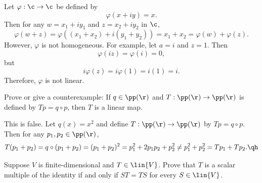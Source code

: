 \begin{sol}
    Let $\varphi: \c \to \c$ be defined by
    \[\varphi(x + iy) = x.\]
    Then for any $w = x_1 + iy_1$ and $z = x_2 + iy_2$ in $\c$,
    \[\varphi(w + z) = \varphi((x_1 + x_2) + i(y_1 + y_2)) = x_1 + x_2 = \varphi(w) + \varphi(z).\]
    However, $\varphi$ is not homogeneous. For example, let $a = i$ and $z = 1$. Then
    \[\varphi(iz) = \varphi(i) = 0,\]
    but
    \[i\varphi(z) = i\varphi(1) = i(1) = i.\]
    Therefore, $\varphi$ is not linear.
\end{sol}

\begin{exercise}[3a10]
    Prove or give a counterexample: If $q \in \pp(\r)$ and $T: \pp(\r) \to \pp(\r)$ is defined by $Tp = q \circ p$, then $T$ is a linear map.
\end{exercise}

\begin{sol}
    This is false. Let $q(x) = x^2$ and define $T: \pp(\r) \to \pp(\r)$ by $Tp = q \circ p$. Then for any $p_1, p_2 \in \pp(\r)$,
    \[T(p_1 + p_2) = q \circ (p_1 + p_2) = (p_1 + p_2)^2 = p_1^2 + 2p_1p_2 + p_2^2 \neq p_1^2 + p_2^2 = Tp_1 + Tp_2. \qh\]
\end{sol}

\begin{exercise}[3a11]
    Suppose $V$ is finite-dimensional and $T \in \lin{V}$. Prove that $T$ is a scalar multiple of the identity if and only if $ST = TS$ for every $S \in \lin{V}$.

\end{exercise}

